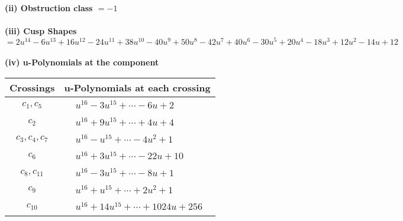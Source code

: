 \documentclass[1p]{elsarticle_modified}
\theoremstyle{definition}
\begin{document}
\flushleft \textbf{(ii) Obstruction class $= -1$}\\~\\
\flushleft \textbf{(iii) Cusp Shapes $= 2 u^{14}-6 u^{13}+16 u^{12}-24 u^{11}+38 u^{10}-40 u^9+50 u^8-42 u^7+40 u^6-30 u^5+20 u^4-18 u^3+12 u^2-14 u+12$}\\~\\
\newpage\renewcommand{\arraystretch}{1}
\flushleft \textbf{(iv) u-Polynomials at the component}\newline \\
\begin{tabular}{m{50pt}|m{274pt}}
Crossings & \hspace{64pt}u-Polynomials at each crossing \\
\hline $$\begin{aligned}c_{1},c_{5}\end{aligned}$$&$\begin{aligned}
&u^{16}-3 u^{15}+\cdots-6 u+2
\end{aligned}$\\
\hline $$\begin{aligned}c_{2}\end{aligned}$$&$\begin{aligned}
&u^{16}+9 u^{15}+\cdots+4 u+4
\end{aligned}$\\
\hline $$\begin{aligned}c_{3},c_{4},c_{7}\end{aligned}$$&$\begin{aligned}
&u^{16}- u^{15}+\cdots-4 u^2+1
\end{aligned}$\\
\hline $$\begin{aligned}c_{6}\end{aligned}$$&$\begin{aligned}
&u^{16}+3 u^{15}+\cdots-22 u+10
\end{aligned}$\\
\hline $$\begin{aligned}c_{8},c_{11}\end{aligned}$$&$\begin{aligned}
&u^{16}-3 u^{15}+\cdots-8 u+1
\end{aligned}$\\
\hline $$\begin{aligned}c_{9}\end{aligned}$$&$\begin{aligned}
&u^{16}+u^{15}+\cdots+2 u^2+1
\end{aligned}$\\
\hline $$\begin{aligned}c_{10}\end{aligned}$$&$\begin{aligned}
&u^{16}+14 u^{15}+\cdots+1024 u+256
\end{aligned}$\\
\hline
\end{tabular}\\~\\
\end{document}
